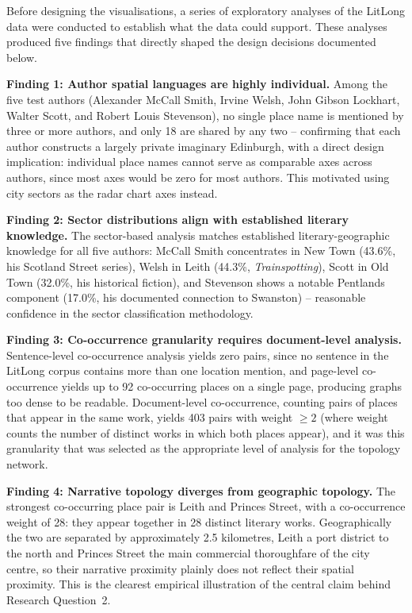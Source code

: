 \documentclass[logo,msc]{infthesis}
\begin{document}
Before designing the visualisations, a series of exploratory analyses of the LitLong data were conducted to establish what the data could support. These analyses produced five findings that directly shaped the design decisions documented below.
 
\textbf{Finding 1: Author spatial languages are highly individual.} Among the five test authors (Alexander McCall Smith, Irvine Welsh, John Gibson Lockhart, Walter Scott, and Robert Louis Stevenson), no single place name is mentioned by three or more authors, and only 18 are shared by any two -- confirming that each author constructs a largely private imaginary Edinburgh, with a direct design implication: individual place names cannot serve as comparable axes across authors, since most axes would be zero for most authors. This motivated using city sectors as the radar chart axes instead.

\textbf{Finding 2: Sector distributions align with established literary knowledge.} The sector-based analysis matches established literary-geographic knowledge for all five authors: McCall Smith concentrates in New Town (43.6\%, his Scotland Street series), Welsh in Leith (44.3\%, \textit{Trainspotting}), Scott in Old Town (32.0\%, his historical fiction), and Stevenson shows a notable Pentlands component (17.0\%, his documented connection to Swanston) -- reasonable confidence in the sector classification methodology.

\textbf{Finding 3: Co-occurrence granularity requires document-level analysis.} Sentence-level co-occurrence analysis yields zero pairs, since no sentence in the LitLong corpus contains more than one location mention, and page-level co-occurrence yields up to 92 co-occurring places on a single page, producing graphs too dense to be readable. Document-level co-occurrence, counting pairs of places that appear in the same work, yields 403 pairs with weight $\geq 2$ (where weight counts the number of distinct works in which both places appear), and it was this granularity that was selected as the appropriate level of analysis for the topology network.

\textbf{Finding 4: Narrative topology diverges from geographic topology.} The strongest co-occurring place pair is Leith and Princes Street, with a co-occurrence weight of 28: they appear together in 28 distinct literary works. Geographically the two are separated by approximately 2.5 kilometres, Leith a port district to the north and Princes Street the main commercial thoroughfare of the city centre, so their narrative proximity plainly does not reflect their spatial proximity. This is the clearest empirical illustration of the central claim behind Research Question~2.
 
\end{document}
